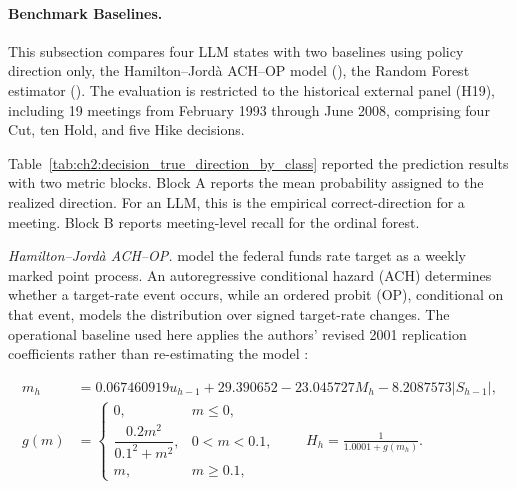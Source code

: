 
\paragraph*{Benchmark Baselines.} This subsection compares four LLM states with two baselines using policy direction only, the Hamilton--Jord\`a ACH--OP
model (\cite{hamiltonjorda2002target}), the Random Forest estimator (\cite{yoonfan2024forecasting}). The evaluation is restricted to the historical external panel (H19), including 19 meetings from February 1993 through June 2008, comprising four Cut, ten Hold, and five Hike decisions.



Table~\ref{tab:ch2:decision_true_direction_by_class} reported the prediction results with two metric blocks. Block A reports the mean probability assigned to
the realized direction. For an LLM, this is the empirical correct-direction for a meeting. Block B reports meeting-level recall for the ordinal forest.


\noindent\textit{Hamilton--Jord\`a ACH--OP.}
\citet{hamiltonjorda2002target} model the federal funds rate target as a
weekly marked point process. An autoregressive conditional hazard (ACH)
determines whether a target-rate event occurs, while an ordered probit (OP),
conditional on that event, models the distribution over signed target-rate
changes. The operational baseline used here applies the authors' revised 2001
replication coefficients rather than re-estimating the model
\citep{hamiltonjorda2001archive}:

\begin{align}
    m_h
    &=0.067460919u_{h-1}+29.390652-23.045727M_h
      -8.2087573\lvert S_{h-1}\rvert, \nonumber\\
    g(m)
    &=
    \begin{cases}
        0, & m\leq 0,\\
        \dfrac{0.2m^2}{0.1^2+m^2}, & 0<m<0.1,\\
        m, & m\geq 0.1,
    \end{cases}
    \qquad
    H_h=\frac{1}{1.0001+g(m_h)}.
    \label{eq:ch2:decision_hj_ach}
\end{align}

